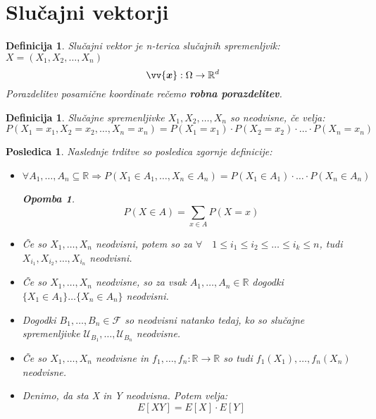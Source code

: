 \documentclass[11pt]{article}
\newtheorem{Posledica}[Izrek]{{\sc Posledica}}
\newtheorem{Definicija}[Izrek]{{\sc Definicija}}
\newtheorem{Opomba}[Izrek]{{\sc Opomba}}
\begin{document}
	\section{Slučajni vektorji}
	\begin{Definicija}
		Slučajni vektor je n-terica slučajnih spremenljvik: $X = (X_1, X_2,\dots , X_n)$
		$$ \vv{\bm{x}}: \Omega \to \mathbb{R}^d$$
		Porazdelitev posamične koordinate rečemo \textbf{robna porazdelitev}.
	\end{Definicija}
	\begin{Definicija}
		Slučajne spremenljivke $X_1,X_2, \dots , X_n$ so neodvisne, če velja:
		$$P(X_1 = x_1, X_2 = x_2,\dotsc, X_n = x_n) = P(X_1 = x_1) \cdot P(X_2 = x_2) \cdot \dotsc \cdot P(X_n = x_n)$$
	\end{Definicija}
	\begin{Posledica}
		Naslednje trditve so posledica zgornje definicije:
		\begin{itemize}
			\item
			$\forall A_1,\dotsc, A_n \subseteq \mathbb{R} \Rightarrow P(X_1 \in A_1, \dotsc, X_n\in A_n) = P(X_1 \in A_1) \cdot \dotsc \cdot P(X_n \in A_n)$
			\begin{Opomba}
				$$P(X\in A ) = \sum_{x\in A}{P(X = x)}$$
			\end{Opomba}
			\item
			Če so $X_1, \dotsc ,X_n$ neodvisni, potem so za $\forall \quad 1\le i_1 \le i_2 \le \dotsc \le i_k\le n$, tudi $X_{i_1}, X_{i_2},\dotsc, X_{i_n}$ neodvisni.
			\item
			Če so $X_1, \dotsc ,X_n$ neodvisne, so za vsak $ A_1,\dotsc, A_n \in \mathbb{R}$ dogodki
			\\
			$\{X_1\in A_1\}\dotsc \{X_n\in A_n \}$ neodvisni.
			\item
			Dogodki $B_1, \dotsc, B_n \in \mathcal{F}$ so neodvisni natanko tedaj, ko so slučajne spremenljivke $ \mathcal{U}_{B_1},\dotsc, \mathcal{U}_{B_n}$ neodvisne.
			\item
			Če so $X_1, \dotsc, X_n$ neodvisne in $f_1,\dotsc,f_n : \mathbb{R} \to \mathbb{R}$ so tudi $f_1(X_1),\dotsc, f_n(X_n)$ neodvisne.
			\item
			Denimo, da sta X in Y neodvisna. Potem velja:
			$$E[XY] = E[X] \cdot E[Y]$$
		\end{itemize}
	\end{Posledica}
\end{document}
